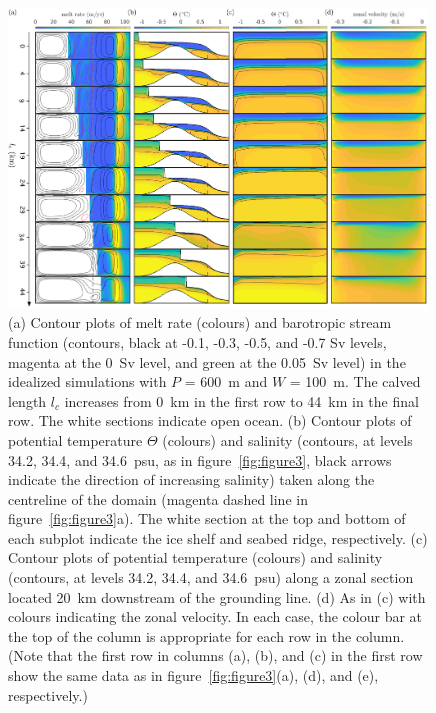\documentclass[draft]{agujournal2019}
\begin{document}
\begin{figure}
    \centering
    \includegraphics[width = 0.99\textwidth]{../make_figures/plots/figure5_axislabel.pdf}
    \caption{(a) Contour plots of melt rate (colours) and barotropic stream function (contours, black at -0.1, -0.3, -0.5, and -0.7 Sv levels, magenta at the 0~Sv level, and green at the 0.05~Sv level) in the idealized simulations with $P$ = 600~m and $W$ = 100~m. The calved length $l_c$ increases from 0~km in the first row to 44~km in the final row. The white sections indicate open ocean. (b) Contour plots of potential temperature $\Theta$ (colours) and salinity (contours, at levels 34.2, 34.4, and 34.6~psu, as in figure~\ref{fig:figure3}, black arrows indicate the direction of increasing salinity) taken along the centreline of the domain (magenta dashed line in figure~\ref{fig:figure3}a). The white section at the top and bottom of each subplot indicate the ice shelf and seabed ridge, respectively. (c) Contour plots of potential temperature (colours) and salinity (contours, at levels 34.2, 34.4, and 34.6~psu) along a zonal section located 20~km downstream of the grounding line. (d) As in (c) with colours indicating the zonal velocity.  In each case, the colour bar at the top of the column is appropriate for each row in the column. (Note that the first row in columns (a), (b), and (c) in the first row show the same data as in figure~\ref{fig:figure3}(a), (d), and (e), respectively.) }
    \label{fig:figure5}
\end{figure}
\end{document}

